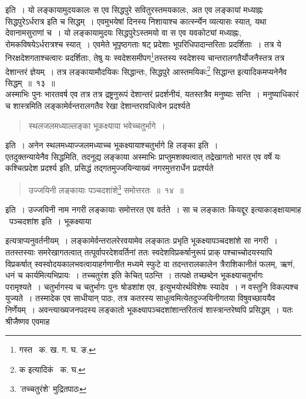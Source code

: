 \documentclass[11pt, openany]{book}
\begin{document}
\indent इति~। यो लङ्कायामुदयकालः स एव सिद्धपुरे सवितुरस्तमयकालः, अत एव लङ्कायां मध्याह्नः सिद्धपुरेऽर्धरात्र 
इति च सिद्धम्~। एवमुभयेषां दिनस्य निशायाश्च कार्त्स्न्येन व्यत्यासः स्यात्, यथा देवानामसुराणां च~। यो लङ्कायामुदयः 
सिद्धपुरेऽस्तमयो वा स एव यवकोट्यां मध्याह्नः, रोमकविषयेऽर्धरात्रश्च स्यात्~। एवमेते भूपृष्ठगताः षट् प्रदेशाः
भूपरिधिपादान्तरिताः प्रदर्शिताः~। तत्र ये निरक्षदेशगताश्चत्वारः प्रदर्शिताः, तेषु यः 
स्वदेशसमीपग\renewcommand{\thefootnote}{१}\footnote{गस्त \textendash\ क. ख. ग. घ. ङ.}तस्तस्य स्वदेशस्य चान्तरालगतैर्योजनैस्तत्र तत्र देशान्तरं ज्ञेयम्~। तत्र लङ्कायामौदयिकः सिद्धान्तः, सिद्धपुरे आस्तमयिकः\renewcommand{\thefootnote}{२}\footnote{क इत्यादिकं \textendash\ क. घ.} सिद्धान्त इत्यादिकमप्यनेनैव सिद्धम्~॥~१३~॥\\ 

\indent अस्माभिः पुनः भारतवर्ष एव तत्र तत्र द्रष्ट्रनुरूपं देशान्तरं प्रदर्शनीयं, यतस्तत्रैव मनुष्याः सन्ति~। मनुष्याधिकारं च शास्त्रमिति लङ्कामेर्वन्तरालगतैव रेखा देशान्तरावधित्वेन प्रदर्श्यते\textendash 

\begin{quote}
{\ab स्थलजलमध्याल्लङ्का भूकक्ष्याया भवेच्चतुर्भागे~।}
\end{quote}

\indent इति~। अनेन स्थलमध्याज्जलमध्याच्च भूकक्ष्यायाश्चतुर्भागे हि लङ्का इति~।\\

\indent एतदुक्तन्यायेनैव सिद्धमिति, तदनूद्य लङ्काया अस्माभिः प्राप्तुमशक्यत्वात् तद्रेखागतो भारत एव वर्षे यः कश्चित्प्रदेश प्रदर्श्य इति, प्रसिद्धं तद्गतमुज्जयिन्याख्यं नगरमुत्तरार्धेन प्रदर्श्यते\textendash 

\begin{quote}
{\ab उज्जयिनी लङ्कायाः पञ्चदशांशे\renewcommand{\thefootnote}{३}\footnote{'तच्चतुरंशे' मुद्रितपाठः} समोत्तरतः~॥~१४~॥}
\end{quote}

\indent इति~। उज्जयिनी नाम नगरी लङ्कायाः समोत्तरत एव वर्तते~। सा च लङ्कातः कियद्दूर इत्याकाङ्क्षायामाह \textendash\ पञ्चदशांश इति~। भूकक्ष्याया 

\newpage 

\noindent इत्यत्राप्यनुवर्तनीयम्~। लङ्कामेर्वन्तरालरेरवयामेव लङ्कातः प्रभृति भूकक्ष्यापञ्चदशांशे सा नगरी~। ततस्तस्याः 
समरेखागतत्वात् तत्पूर्वापरदेशवर्तिनां ततः स्वदेशविप्रकर्षानुरूपं प्राक् पश्चाच्चोदयस्यापि विप्रकर्षात् स्वस्वोदयकालभवत्वायाहर्गणानीत मध्यमे स्फुटे वा तदन्तरालकालेन त्रैराशिकानीतं फलम्, ऋणं, धनं च कार्यमित्यभिप्रायः~। तच्चतुरंश इति केचित् पठन्ति~। तत्पक्षे 
तच्छब्देन भूकक्ष्याचतुर्भागः परामृश्यते~। चतुर्भागस्य च चतुर्भागः पुनः षोडशांश एव, इत्युभयोरर्थविशेषः स्यादेव~। न वस्तुनि विकल्पश्च युज्यते~। तस्मादेक एव साधीयान् पाठः, तत्र कतरस्य साधुत्वमित्येतदुज्जयिनीगतया विषुवच्छाययैव निर्णेयम्~। अवन्त्याख्यजनपदस्य लङ्कातो भूकक्ष्यापञ्चदशांशान्तरितत्वं शास्त्रान्तरेष्वपि प्रसिद्धम्~। यतः श्रीजैष्णव एवमाह\textendash  
\end{document}
